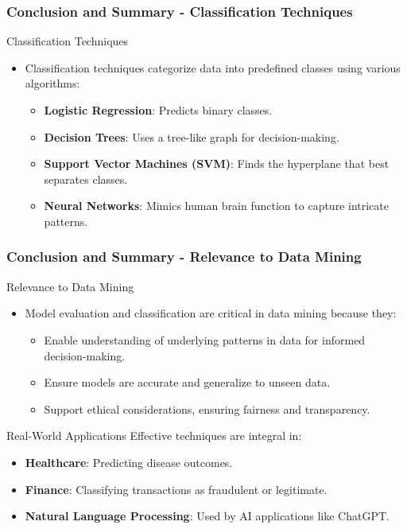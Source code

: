 \documentclass[aspectratio=169]{beamer}
\begin{document}
\begin{frame}[fragile]
    \frametitle{Conclusion and Summary - Classification Techniques}
    \begin{block}{Classification Techniques}
        \begin{itemize}
            \item Classification techniques categorize data into predefined classes using various algorithms:
            \begin{itemize}
                \item \textbf{Logistic Regression}: Predicts binary classes.
                \item \textbf{Decision Trees}: Uses a tree-like graph for decision-making.
                \item \textbf{Support Vector Machines (SVM)}: Finds the hyperplane that best separates classes.
                \item \textbf{Neural Networks}: Mimics human brain function to capture intricate patterns.
            \end{itemize}
        \end{itemize}
    \end{block}
\end{frame}

\begin{frame}[fragile]
    \frametitle{Conclusion and Summary - Relevance to Data Mining}
    \begin{block}{Relevance to Data Mining}
        \begin{itemize}
            \item Model evaluation and classification are critical in data mining because they:
            \begin{itemize}
                \item Enable understanding of underlying patterns in data for informed decision-making.
                \item Ensure models are accurate and generalize to unseen data.
                \item Support ethical considerations, ensuring fairness and transparency.
            \end{itemize}
        \end{itemize}
    \end{block}
    \begin{block}{Real-World Applications}
        Effective techniques are integral in:
        \begin{itemize}
            \item \textbf{Healthcare}: Predicting disease outcomes.
            \item \textbf{Finance}: Classifying transactions as fraudulent or legitimate.
            \item \textbf{Natural Language Processing}: Used by AI applications like ChatGPT.
        \end{itemize}
    \end{block}
\end{frame}
\end{document}
